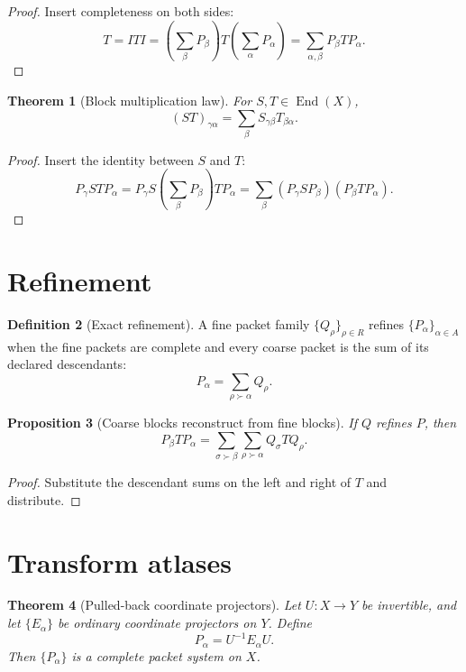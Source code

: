 \documentclass[11pt,oneside]{book}
\newtheorem{theorem}{Theorem}[chapter]
\newtheorem{proposition}[theorem]{Proposition}
\theoremstyle{definition}
\newtheorem{definition}[theorem]{Definition}
\theoremstyle{remark}
\newcommand{\Id}{I}
\begin{document}
\begin{proof}
Insert completeness on both sides:
\[
T=\Id T\Id
=\left(\sum_\beta P_\beta\right)T\left(\sum_\alpha P_\alpha\right)
=\sum_{\alpha,\beta}P_\beta TP_\alpha.
\]
\end{proof}

\begin{theorem}[Block multiplication law]\label{thm:block-product}
For $S,T\in\operatorname{End}(X)$,
\[
\boxed{(ST)_{\gamma\alpha}=\sum_\beta S_{\gamma\beta}T_{\beta\alpha}.}
\]
\end{theorem}

\begin{proof}
Insert the identity between $S$ and $T$:
\[
P_\gamma STP_\alpha
=P_\gamma S\left(\sum_\beta P_\beta\right)TP_\alpha
=\sum_\beta(P_\gamma SP_\beta)(P_\beta TP_\alpha).
\]
\end{proof}

\section{Refinement}
\begin{definition}[Exact refinement]
A fine packet family $\{Q_\rho\}_{\rho\in R}$ refines $\{P_\alpha\}_{\alpha\in A}$ when the fine packets are complete and every coarse packet is the sum of its declared descendants:
\[
P_\alpha=\sum_{\rho\succ\alpha}Q_\rho.
\]
\end{definition}

\begin{proposition}[Coarse blocks reconstruct from fine blocks]\label{prop:block-refinement}
If $Q$ refines $P$, then
\[
\boxed{
P_\beta TP_\alpha
=\sum_{\sigma\succ\beta}\sum_{\rho\succ\alpha}Q_\sigma TQ_\rho.
}
\]
\end{proposition}

\begin{proof}
Substitute the descendant sums on the left and right of $T$ and distribute.
\end{proof}

\section{Transform atlases}
\begin{theorem}[Pulled-back coordinate projectors]\label{thm:transform-atlas}
Let $U:X\to Y$ be invertible, and let $\{E_\alpha\}$ be ordinary coordinate projectors on $Y$. Define
\[
P_\alpha=U^{-1}E_\alpha U.
\]
Then $\{P_\alpha\}$ is a complete packet system on $X$.
\end{theorem}
\end{document}
